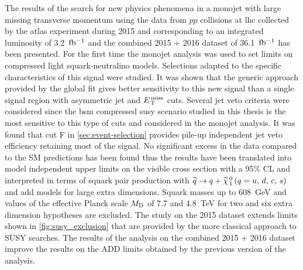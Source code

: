 The results of the search for new physics phenomena in a monojet with large
missing transverse momentum using the data from $pp$ collisions at \gls{lhc}
collected by the \gls{atlas} experiment during 2015 and corresponding to an
integrated luminosity of 3.2~$\mbox{fb$^{-1}$}$ and the combined 2015 + 2016 dataset of
36.1~$\mbox{fb$^{-1}$}$ has been presented. For the first time the monojet analysis was used
to set limits on compressed light squark-neutralino models. Selections adapted
to the specific characteristics of this signal were studied. It was shown that
the generic approach provided by the global fit gives better sensitivity to this
new signal than a single signal region with asymmetric jet and $E_\mathrm{\, T}^\mathrm{\, miss}$
cuts. Several jet veto criteria were considered since the \gls{bsm} compressed
\gls{susy} scenario studied in this thesis is the most sensitive to this type of
cuts and considered in the monojet analysis. It was found that cut F in
\cref{sec:event-selection} provides pile-up independent jet veto efficiency
retaining most of the signal. No significant excess in the data compared to the
SM predictions has been found thus the results have been translated into model
independent upper limits on the visible cross section with a 95\% CL and
interpreted in terms of squark pair production with $\widetilde{q} \rightarrow q + \widetilde{\chi}_{\, 1}^{\, 0}\, (q = u,\, d,\, c,\, s)$ and \gls{add}
models for large extra dimensions. Squark masses up to 608~GeV and values of the
effective Planck scale $M_\mathrm{D}$ of 7.7 and 4.8~TeV for two and six extra dimension
hypotheses are excluded. The study on the 2015 dataset extends limits shown in
\cref{fig:susy_exclusion} that are provided by the more classical approach to
SUSY searches. The results of the analysis on the combined 2015 + 2016 dataset
improve the results on the ADD limits obtained by the previous version of the
analysis.
